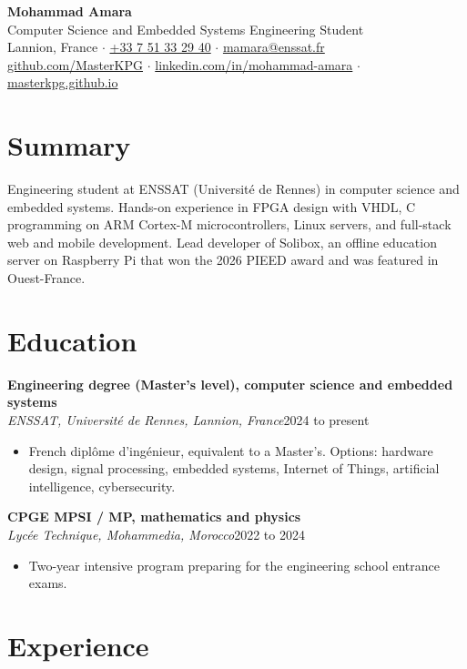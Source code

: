 \documentclass[10pt,a4paper]{article}
\newcommand{\entry}[3]{%
  \par\addvspace{6pt}%
  \noindent\textbf{#1}\\
  \textit{#2}\hfill #3\par
}
\begin{document}
\begin{center}
  {\LARGE\bfseries Mohammad Amara}\\[5pt]
  {\large Computer Science and Embedded Systems Engineering Student}\\[7pt]
  Lannion, France \quad$\cdot$\quad
  \href{tel:+33751332940}{+33 7 51 33 29 40} \quad$\cdot$\quad
  \href{mailto:mamara@enssat.fr}{mamara@enssat.fr}\\[2pt]
  \href{https://github.com/MasterKPG}{github.com/MasterKPG} \quad$\cdot$\quad
  \href{https://www.linkedin.com/in/mohammad-amara/}{linkedin.com/in/mohammad-amara} \quad$\cdot$\quad
  \href{https://masterkpg.github.io}{masterkpg.github.io}
\end{center}

\section*{Summary}

Engineering student at ENSSAT (Université de Rennes) in computer science and embedded systems.
Hands-on experience in FPGA design with VHDL, C programming on ARM Cortex-M microcontrollers, Linux
servers, and full-stack web and mobile development. Lead developer of Solibox, an offline education
server on Raspberry Pi that won the 2026 PIEED award and was featured in Ouest-France.

\section*{Education}

\entry{Engineering degree (Master's level), computer science and embedded systems}{ENSSAT, Université de Rennes, Lannion, France}{2024 to present}
\begin{itemize}
  \item French diplôme d'ingénieur, equivalent to a Master's. Options: hardware design, signal
        processing, embedded systems, Internet of Things, artificial intelligence, cybersecurity.
\end{itemize}

\entry{CPGE MPSI / MP, mathematics and physics}{Lycée Technique, Mohammedia, Morocco}{2022 to 2024}
\begin{itemize}
  \item Two-year intensive program preparing for the engineering school entrance exams.
\end{itemize}

\section*{Experience}
\end{document}
